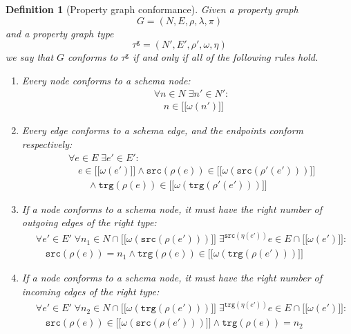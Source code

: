 \documentclass[a4paper]{article}
\newtheorem{definition}[theorem]{Definition}
\newcommand{\src}{\mathtt{src}}
\newcommand{\trg}{\mathtt{trg}}
\newcommand{\gtype}{\tau^\mathsf{g}}
\newcommand{\lsem}{\ensuremath{[\![}}
\newcommand{\rsem}{\ensuremath{]\!]}}
\newcommand{\sem}[1]{\ensuremath{\lsem #1 \rsem}}
\begin{document}
\begin{definition}[Property graph conformance]
  Given a property graph $$G = (N, E, \rho, \lambda, \pi)$$ and a property graph type $$\gtype = (N', E', \rho', \omega, \eta)$$ we say that $G$ \emph{conforms} to $\gtype$ if and only if all of the following rules hold.

  \begin{enumerate}
    \item Every node conforms to a schema node:
    \begin{align*}
      &\forall n \in N \; \exists n' \in N' :\\
      &\quad n \in \sem{\omega(n')}
    \end{align*}
    
    \item Every edge conforms to a schema edge, and the endpoints conform respectively:
    \begin{align*}
      &\forall e \in E \; \exists e' \in E' :\\
      &\quad e \in \sem{\omega(e')} \wedge \src(\rho(e)) \in \sem{\omega(\src(\rho'(e')))}\\
      &\quad\quad\wedge \trg(\rho(e)) \in \sem{\omega(\trg(\rho'(e')))}
    \end{align*}
    
    \item If a node conforms to a schema node, it must have the right number of outgoing edges of the right type:
    \begin{align*}
      &\forall e' \in E' \; \forall n_1 \in N \cap \sem{\omega(\src(\rho(e')))} \; \exists^{\src(\eta(e'))} e \in E \cap \sem{\omega(e')} :\\
      &\quad \src(\rho(e)) = n_1 \wedge \trg(\rho(e)) \in \sem{\omega(\trg(\rho(e')))}
    \end{align*}

    \item If a node conforms to a schema node, it must have the right number of incoming edges of the right type:
    \begin{align*}
      &\forall e' \in E' \; \forall n_2 \in N \cap \sem{\omega(\trg(\rho(e')))} \; \exists^{\trg(\eta(e'))} e \in E \cap \sem{\omega(e')} :\\
      &\quad \src(\rho(e)) \in \sem{\omega(\src(\rho(e')))} \wedge \trg(\rho(e)) = n_2
    \end{align*}
  \end{enumerate}
\end{definition}
\end{document}
